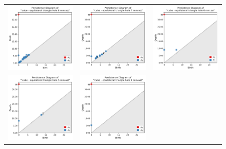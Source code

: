 \documentclass[ma]{uncgdissertationexp}
\theoremstyle{plain}
\theoremstyle{definition}
\theoremstyle{remark}
\begin{document}
\begin{figure}[H]
\begin{center}
    \begin{tabular}{ccc}
         \includegraphics[width=1.875in]{Final Run, (cube - equilateral triangle hole 8 mm) persdia.png} &
         \includegraphics[width=1.875in]{Final Run, (cube - equilateral triangle hole 7 mm) persdia.png} &  
         \includegraphics[width=1.875in]{Final Run, (cube - equilateral triangle hole 6 mm) persdia.png} \\
         \includegraphics[width=1.875in]{Final Run, (cube - equilateral triangle hole 5 mm) persdia.png} & 
         \includegraphics[width=1.875in]{Final Run, (cube - equilateral triangle hole 4 mm) persdia.png} & 

\end{tabular}
\end{center}
\end{figure}
\end{document}
